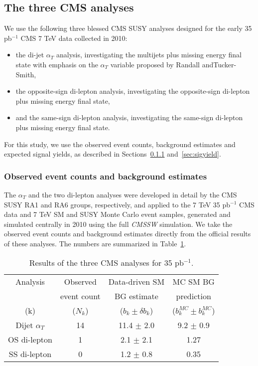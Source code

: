 \subsection{The three CMS analyses}

We use the following three blessed CMS SUSY analyses designed for the early 35 pb$^{-1}$ CMS 7 TeV data  collected in 2010:
\begin{itemize}
\item the di-jet $\alpha_T$ analysis, investigating the multijets plus missing energy final state with emphasis on the $\alpha_T$ variable proposed by Randall andTucker-Smith,
\item the opposite-sign di-lepton analysis, investigating the opposite-sign di-lepton plus missing energy final state,
\item and the same-sign di-lepton analysis, investigating the same-sign di-lepton plus missing energy final state.
\end{itemize}
For this study, we use the observed event counts, background estimates and expected signal yields, as described in Sections~\ref{sec:dbgcount} and~\ref{sec:sigyield}.

\subsubsection{Observed event counts and background estimates}
\label{sec:dbgcount}

The $\alpha_T$ and the two di-lepton analyses were developed in detail by the CMS SUSY RA1 and RA6 groups, respectively, and applied to the 7 TeV 35 pb$^{-1}$ CMS data and 7 TeV SM and SUSY Monte Carlo event samples, 
generated and simulated centrally in 2010
using the full {\it CMSSW} simulation.
We take the observed event counts and background estimates directly from the official results of these analyses.  The numbers are summarized in Table~\ref{tab:dbgcount}.

\begin{table}[htdp]
\caption{Results of the three CMS analyses for 35 pb$^{-1}$.}
\begin{center}
\begin{tabular}{|c|c|c|c|}
\hline
Analysis & Observed    & Data-driven SM & MC SM BG \\
              & event count & BG estimate      & prediction    \\
(k)          & ($N_k$)     & ($b_k \pm \delta b_k$) & ($b_k^{MC} \pm b_k^{MC}$) \\
\hline              
Dijet $\alpha_T$ & 14 & 11.4 $\pm$ 2.0 & 9.2 $\pm$ 0.9 \\
OS di-lepton & 1 & 2.1 $\pm$ 2.1 & 1.27 \\
SS di-lepton & 0 & 1.2 $\pm$ 0.8 & 0.35 \\
\hline
\end{tabular}
\end{center}
\label{tab:dbgcount}
\end{table}%


